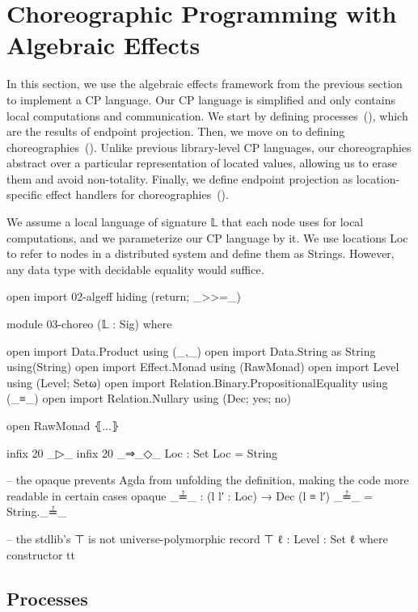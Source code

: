 \section{Choreographic Programming with Algebraic Effects}
\label{sec:cp-alg-eff}

In this section, we use the algebraic effects framework from the previous section to implement a CP language.
%
Our CP language is simplified and only contains local computations and communication.
%
We start by defining processes~(), which are the results of endpoint projection.
%
Then, we move on to defining choreographies~().
%
Unlike previous library-level CP languages, our choreographies abstract over a particular representation of located values, allowing us to erase them and avoid non-totality.
%
Finally, we define endpoint projection as location-specific effect handlers for choreographies~().

We assume a local language of signature 𝕃 that each node uses for local computations, and we parameterize our CP language by it.
%
We use locations Loc to refer to nodes in a distributed system and define them as Strings.
%
However, any data type with decidable equality would suffice.

\begin{code}[hide]
open import 02-algeff hiding (return; _>>=_)

module 03-choreo (𝕃 : Sig) where

open import Data.Product using (_,_)
open import Data.String as String using(String)
open import Effect.Monad using (RawMonad)
open import Level using (Level; Setω)
open import Relation.Binary.PropositionalEquality using (_≡_)
open import Relation.Nullary using (Dec; yes; no)

open RawMonad ⦃...⦄

infix 20 _▷_
infix 20 _⇒_◇_
Loc : Set
Loc = String

-- the opaque prevents Agda from unfolding the definition, making the code more readable in certain cases
opaque
  _≟_ : (l l′ : Loc) → Dec (l ≡ l′)
  _≟_ = String._≟_

-- the stdlib's ⊤ is not universe-polymorphic
record ⊤ {ℓ : Level} : Set ℓ where
  constructor tt
\end{code}

\subsection{Processes}
\label{sec:process}

